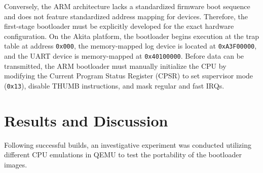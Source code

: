 \documentclass{article}
\begin{document}
Conversely, the ARM architecture lacks a standardized firmware boot sequence and does not feature standardized address mapping for devices. Therefore, the first-stage bootloader must be explicitly developed for the exact hardware configuration. On the Akita platform, the bootloader begins execution at the trap table at address \texttt{0x000}, the memory-mapped log device is located at \texttt{0xA3F00000}, and the UART device is memory-mapped at \texttt{0x40100000}. Before data can be transmitted, the ARM bootloader must manually initialize the CPU by modifying the Current Program Status Register (CPSR) to set supervisor mode (\texttt{0x13}), disable THUMB instructions, and mask regular and fast IRQs. 

\section{Results and Discussion}
Following successful builds, an investigative experiment was conducted utilizing different CPU emulations in QEMU to test the portability of the bootloader images. 
\end{document}
